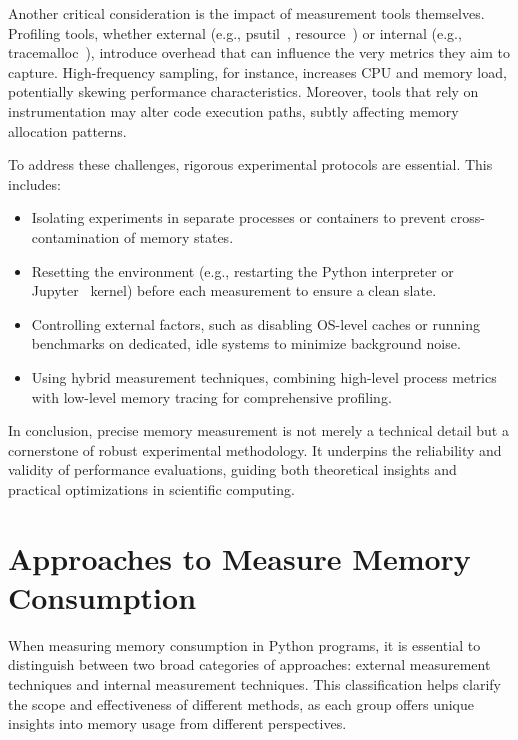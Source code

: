 Another critical consideration is the impact of measurement tools themselves.
Profiling tools, whether external (e.g., psutil~\cite{psutil}, resource~\cite{importlib_resources}) or internal (e.g., tracemalloc~\cite{tracemalloc}), introduce overhead that can influence the very metrics they aim to capture.
High-frequency sampling, for instance, increases CPU and memory load, potentially skewing performance characteristics.
Moreover, tools that rely on instrumentation may alter code execution paths, subtly affecting memory allocation patterns.

To address these challenges, rigorous experimental protocols are essential.
This includes:

\begin{itemize}
    \item Isolating experiments in separate processes or containers to prevent cross-contamination of memory states.
    \item Resetting the environment (e.g., restarting the Python interpreter or Jupyter~\cite{jupyter} kernel) before each measurement to ensure a clean slate.
    \item Controlling external factors, such as disabling OS-level caches or running benchmarks on dedicated, idle systems to minimize background noise.
    \item Using hybrid measurement techniques, combining high-level process metrics with low-level memory tracing for comprehensive profiling.
\end{itemize}

In conclusion, precise memory measurement is not merely a technical detail but a cornerstone of robust experimental methodology.
It underpins the reliability and validity of performance evaluations, guiding both theoretical insights and practical optimizations in scientific computing.


\section{Approaches to Measure Memory Consumption}
\label{sec:mmc-approaches}

When measuring memory consumption in Python programs, it is essential to distinguish between two broad categories of approaches: external measurement techniques and internal measurement techniques.
This classification helps clarify the scope and effectiveness of different methods, as each group offers unique insights into memory usage from different perspectives.


